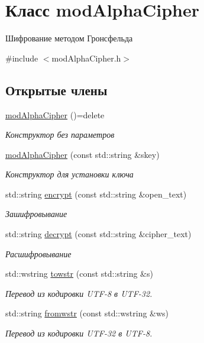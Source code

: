 \hypertarget{classmodAlphaCipher}{}\section{Класс mod\+Alpha\+Cipher}
\label{classmodAlphaCipher}


Шифрование методом Гронсфельда  




{\ttfamily \#include $<$mod\+Alpha\+Cipher.\+h$>$}

\subsection*{Открытые члены}
\begin{DoxyCompactItemize}
\item 
\hyperlink{classmodAlphaCipher_a4f0a86c20f5d836f66cb1e640d875e6b}{mod\+Alpha\+Cipher} ()=delete
\begin{DoxyCompactList}\small\item\em Конструктор без параметров \end{DoxyCompactList}\item 
\hyperlink{classmodAlphaCipher_a76a420025b3c08f72c9b996d83c6ff09}{mod\+Alpha\+Cipher} (const std\+::string \&skey)
\begin{DoxyCompactList}\small\item\em Конструктор для установки ключа \end{DoxyCompactList}\item 
std\+::string \hyperlink{classmodAlphaCipher_ab855d6b2ba63a70d84abc8b15700da63}{encrypt} (const std\+::string \&open\+\_\+text)
\begin{DoxyCompactList}\small\item\em Зашифровывание \end{DoxyCompactList}\item 
std\+::string \hyperlink{classmodAlphaCipher_af1f0fa8ec93df56aa7657494de2a3f00}{decrypt} (const std\+::string \&cipher\+\_\+text)
\begin{DoxyCompactList}\small\item\em Расшифровывание \end{DoxyCompactList}\item 
std\+::wstring \hyperlink{classmodAlphaCipher_ad8496ce022685d8262b1f26f4b993de3}{towstr} (const std\+::string \&s)
\begin{DoxyCompactList}\small\item\em Перевод из кодировки U\+T\+F-\/8 в U\+T\+F-\/32. \end{DoxyCompactList}\item 
std\+::string \hyperlink{classmodAlphaCipher_aa0319b273a77c5ac7ea5407e7534e1c6}{fromwstr} (const std\+::wstring \&ws)
\begin{DoxyCompactList}\small\item\em Перевод из кодировки U\+T\+F-\/32 в U\+T\+F-\/8. \end{DoxyCompactList}\end{DoxyCompactItemize}


